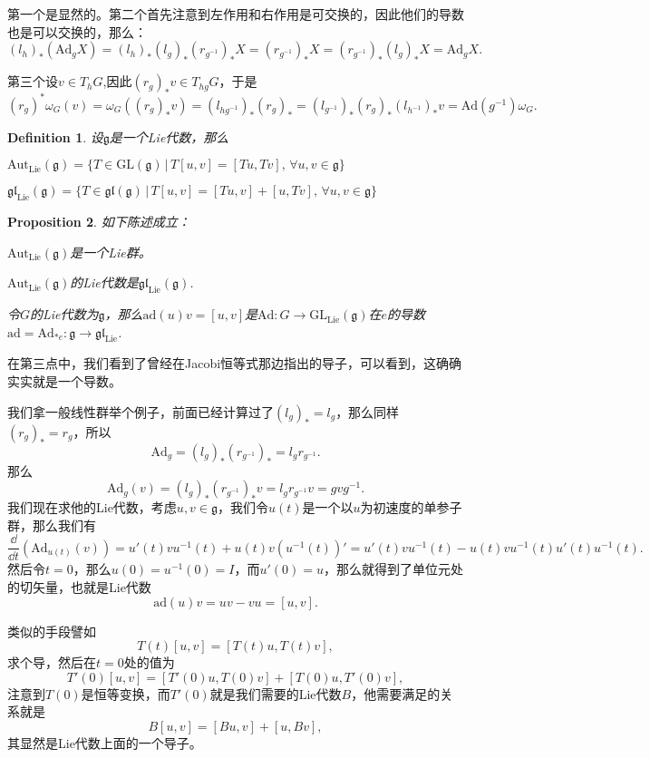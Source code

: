 \documentclass[8pt]{book}
\theoremstyle{plain}
\newtheorem{defi}{Definition}
\newtheorem{pro}[defi]{Proposition}
\newcommand{\lag}{{\mathfrak{g}}}  %
\newcommand{\ad}{{\mathrm{ad}}}
\begin{document}
第一个是显然的。第二个首先注意到左作用和右作用是可交换的，因此他们的导数也是可以交换的，那么：
\[
	(l_h)_*(\mathrm{Ad}_gX)=(l_h)_*(l_g)_*(r_{g^{-1}})_*X=(r_{g^{-1}})_*X=(r_{g^{-1}})_*(l_g)_*X=\mathrm{Ad}_gX.
\]

第三个设$v\in T_hG$,因此$(r_g)_*v\in T_{hg}G$，于是
\[
	(r_g)^*\omega_G(v)=\omega_G((r_g)_*v)=(l_{{hg}^{-1}})_*(r_g)_*
	=(l_{{g}^{-1}})_*(r_g)_*(l_{{h}^{-1}})_*v=\mathrm{Ad}(g^{-1})\omega_G.
\]

\begin{defi}
设$\lag$是一个Lie代数，那么

 $\mathrm{Aut}_{\mathrm{Lie}}(\lag)=\{T\in \mathrm{GL}(\lag)\,|\,T[u,v]=[Tu,Tv],\,\forall u,v\in\lag\}$

 $\mathfrak{gl}_{\mathrm{Lie}}(\lag)=\{T\in \mathfrak{gl}(\lag)\,|\,T[u,v]=[Tu,v]+[u,Tv],\,\forall u,v\in\lag\}$
\end{defi}

\begin{pro}如下陈述成立：

 $\mathrm{Aut}_{\mathrm{Lie}}(\lag)$是一个Lie群。

 $\mathrm{Aut}_{\mathrm{Lie}}(\lag)$的Lie代数是$\mathfrak{gl}_{\mathrm{Lie}}(\lag)$.

 令$G$的Lie代数为$\lag$，那么$\ad(u)v=[u,v]$是$\mathrm{Ad}:G\to \mathrm{GL}_{\mathrm{Lie}}(\lag)$在$e$的导数$\ad=\mathrm{Ad}_{*e}:\lag\to \mathfrak{gl}_{\mathrm{Lie}}$.
\end{pro}

在第三点中，我们看到了曾经在Jacobi恒等式那边指出的导子，可以看到，这确确实实就是一个导数。

我们拿一般线性群举个例子，前面已经计算过了$(l_g)_*=l_g$，那么同样$(r_g)_*=r_g$，所以
\[
	\mathrm{Ad}_g=(l_g)_*(r_{g^{-1}})_*=l_gr_{g^{-1}}.
\]
那么
\[
	\mathrm{Ad}_g(v)=(l_g)_*(r_{g^{-1}})_*v=l_gr_{g^{-1}}v=gvg^{-1}.
\]
我们现在求他的Lie代数，考虑$u,v\in \lag$，我们令$u(t)$是一个以$u$为初速度的单参子群，那么我们有
\[
\frac{\dd}{\dd t}(\mathrm{Ad}_{u(t)}(v))=u'(t)vu^{-1}(t)+u(t)v(u^{-1}(t))'=u'(t)vu^{-1}(t)-u(t)vu^{-1}(t)u'(t)u^{-1}(t).
\]
然后令$t=0$，那么$u(0)=u^{-1}(0)=I$，而$u'(0)=u$，那么就得到了单位元处的切矢量，也就是Lie代数
\[
\ad(u)v=uv-vu=[u,v].
\]

类似的手段譬如
\[
T(t)[u,v]=[T(t)u,T(t)v],
\]
求个导，然后在$t=0$处的值为
\[
T'(0)[u,v]=[T'(0)u,T(0)v]+[T(0)u,T'(0)v],
\]
注意到$T(0)$是恒等变换，而$T'(0)$就是我们需要的Lie代数$B$，他需要满足的关系就是
\[
B[u,v]=[Bu,v]+[u,Bv],
\]
其显然是Lie代数上面的一个导子。
\end{document}
